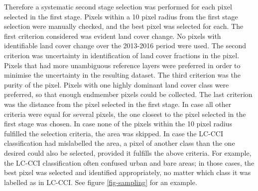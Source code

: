 \documentclass[a4paper,10pt]{book}
\begin{document}
Therefore a systematic second stage selection was performed for each pixel selected in the first stage. Pixels within a 10 pixel radius from the first stage selection were manually checked, and the best pixel was selected for each. The first criterion considered was evident land cover change. No pixels with identifiable land cover change over the 2013-2016 period were used. The second criterion was uncertainty in identification of land cover fractions in the pixel. Pixels that had more unambiguous reference layers were preferred in order to minimise the uncertainty in the resulting dataset. The third criterion was the purity of the pixel. Pixels with one highly dominant land cover class were preferred, so that enough endmember pixels could be collected. The last criterion was the distance from the pixel selected in the first stage. In case all other criteria were equal for several pixels, the one closest to the pixel selected in the first stage was chosen. In case none of the pixels within the 10 pixel radius fulfilled the selection criteria, the area was skipped. In case the LC-CCI classification had mislabelled the area, a pixel of another class than the one desired could also be selected, provided it fulfills the above criteria. For example, the LC-CCI classification often confused urban and bare areas; in those cases, the best pixel was selected and identified appropriately, no matter which class it was labelled as in LC-CCI. See figure \ref{fig-sampling} for an example.
\end{document}
